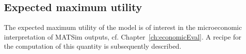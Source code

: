 


\subsection{\label{sub:expected-maximum-utility}Expected maximum utility}

The expected maximum utility of the model  is of
interest in the microeconomic interpretation of MATSim outputs, cf.
Chapter~\ref{ch:economicEval}. A recipe for the computation of this quantity
is subsequently described. 

